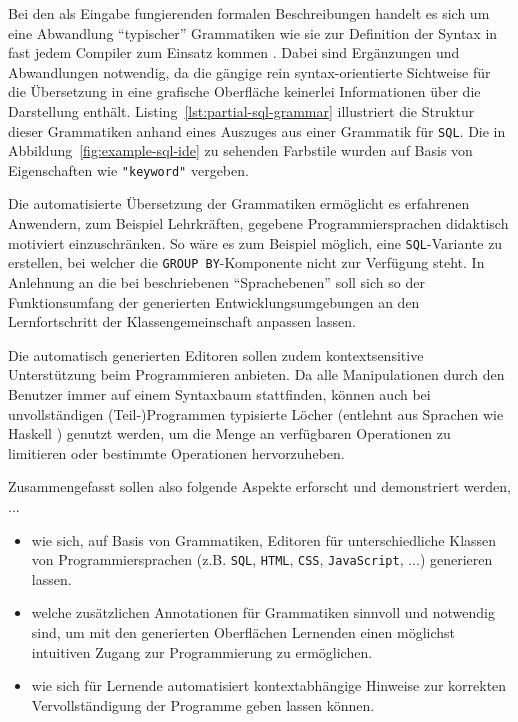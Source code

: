\documentclass[paper=a4,fontsize=12pt,parskip=half]{scrartcl}
\begin{document}
Bei den als Eingabe fungierenden formalen Beschreibungen handelt es sich um eine Abwandlung \enquote{typischer} Grammatiken wie sie zur Definition der Syntax in fast jedem Compiler zum Einsatz kommen \cite[S. 42ff]{aho_compilers:_2007}. Dabei sind Ergänzungen und Abwandlungen notwendig, da die gängige rein syntax-orientierte Sichtweise für die Übersetzung in eine grafische Oberfläche keinerlei Informationen über die Darstellung enthält. Listing~\ref{lst:partial-sql-grammar} illustriert die Struktur dieser Grammatiken anhand eines Auszuges aus einer Grammatik für \texttt{SQL}. Die in Abbildung~\ref{fig:example-sql-ide} zu sehenden Farbstile wurden auf Basis von Eigenschaften wie \texttt{"keyword"} vergeben.

Die automatisierte Übersetzung der Grammatiken ermöglicht es erfahrenen Anwendern, zum Beispiel Lehrkräften, gegebene Programmiersprachen didaktisch motiviert einzuschränken. So wäre es zum Beispiel möglich, eine \texttt{SQL}-Variante zu erstellen, bei welcher die \texttt{GROUP BY}-Komponente nicht zur Verfügung steht. In Anlehnung an die bei \cite{klaeren_macht_2007} beschriebenen \enquote{Sprachebenen} soll sich so der Funktionsumfang der generierten Entwicklungsumgebungen an den Lernfortschritt der Klassengemeinschaft anpassen lassen.

Die automatisch generierten Editoren sollen zudem kontextsensitive Unterstützung beim Programmieren anbieten. Da alle Manipulationen durch den Benutzer immer auf einem Syntaxbaum stattfinden, können auch bei unvollständigen (Teil-)Programmen typisierte Löcher (entlehnt aus Sprachen wie Haskell \cite{jones_haskell_2014}) genutzt werden, um die Menge an verfügbaren Operationen zu limitieren oder bestimmte Operationen hervorzuheben.

Zusammengefasst sollen also folgende Aspekte erforscht und demonstriert werden, ...

\begin{itemize}
\item wie sich, auf Basis von Grammatiken, Editoren für unterschiedliche Klassen von Programmiersprachen (z.B. \texttt{SQL}, \texttt{HTML}, \texttt{CSS}, \texttt{JavaScript}, ...) generieren lassen.
\item welche zusätzlichen Annotationen für Grammatiken sinnvoll und notwendig sind, um mit den generierten Oberflächen Lernenden einen möglichst intuitiven Zugang zur Programmierung zu ermöglichen.
\item wie sich für Lernende automatisiert kontextabhängige Hinweise zur korrekten Vervollständigung der Programme geben lassen können.
\end{itemize}
\end{document}
